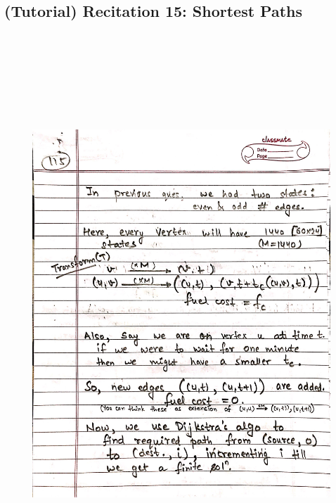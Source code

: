 \newpage
{\color{black} \subsection*{(Tutorial) Recitation 15: Shortest Paths}}
\begin{figure}[H]
    \centering
    \includegraphics[width=16cm, height=21cm]{"./MIT-6.006/MIT-6006-115"}
\end{figure}

